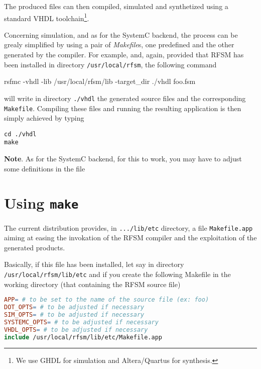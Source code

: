 The produced files can then compiled, simulated and synthetized using a standard VHDL
toolchain\footnote{We use GHDL for simulation and Altera/Quartus for synthesis.}.

Concerning simulation, and as for the SystemC backend, the process can be grealy simplified by using
a pair of \emph{Makefile}s, one predefined and the other generated by the compiler.  For example,
and, again, provided that RFSM has been installed in directory \verb|/usr/local/rfsm|, the following
command

\begin{FVerbatim}
rsfmc -vhdl -lib /usr/local/rfsm/lib -target_dir ./vhdl  foo.fsm  
\end{FVerbatim}

will write in directory \verb|./vhdl| the generated source files and the corresponding
\verb|Makefile|. Compiling these files and running the resulting application is then simply achieved
by typing

\begin{verbatim}
cd ./vhdl
make 
\end{verbatim}

\medskip
\textbf{Note}. As for the SystemC backend, for this to work, you may have to adjust some definitions in the file

\section{Using \texttt{make}}
\label{sec:makefile}

The current distribution provides, in \verb|.../lib/etc| directory, a file \verb|Makefile.app|
aiming at easing the invokation of the RFSM compiler and the exploitation of the generated
products.

Basically, if this file has been installed, let say in directory \verb|/usr/local/rfsm/lib/etc|
and if you create the following Makefile in the working directory (that containing the RFSM source
file)

\begin{lstlisting}[language=make,frame=single]
APP= # to be set to the name of the source file (ex: foo)
DOT_OPTS= # to be adjusted if necessary
SIM_OPTS= # to be adjusted if necessary
SYSTEMC_OPTS= # to be adjusted if necessary
VHDL_OPTS= # to be adjusted if necessary
include /usr/local/rfsm/lib/etc/Makefile.app
\end{lstlisting}


